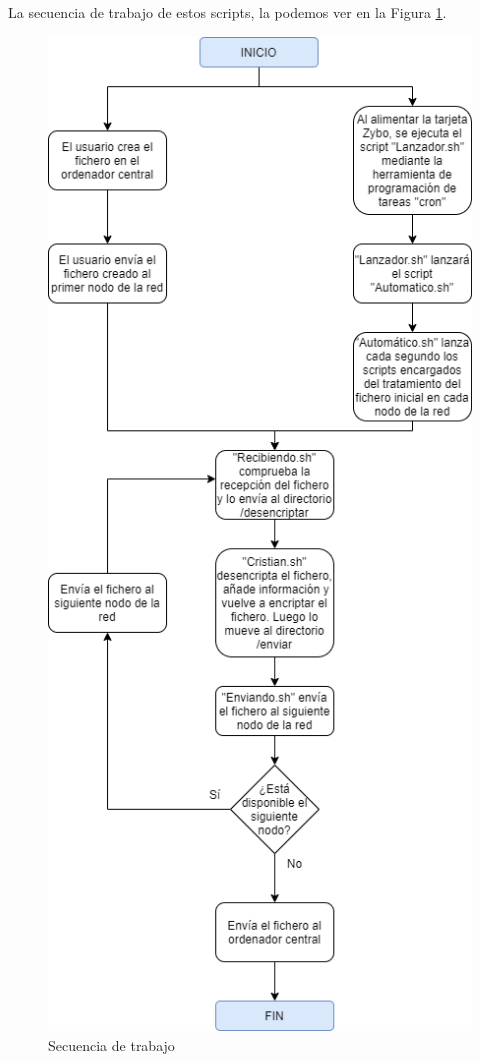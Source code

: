 La secuencia de trabajo de estos scripts, la podemos ver en la Figura \ref{Secuencia de trabajo}.
\begin{figure}[h]
	\centering
	\includegraphics[scale=0.475]{Metodologia/AnalisisSistema/CadenaScripts.png}
	\caption{Secuencia de trabajo}
	\label{Secuencia de trabajo}
\end{figure}
\newpage